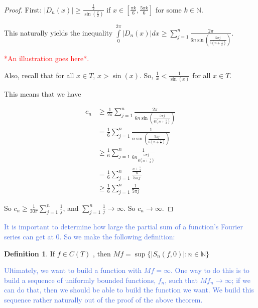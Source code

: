 \documentclass{amsart}
\newcommand{\N}{\mathbb{N}}
\newcommand{\colorcomment}[2]{\textcolor{#1}{#2}} %
\newcommand{\absval}[1]{\lvert #1 \rvert}
\theoremstyle{definition}
\newtheorem{definition}[thm]{Definition}
\begin{document}
\begin{proof}

First: $\absval{D_n(x)} \geq \frac{\frac{1}{2}}{\sin(\frac{x}{2})}$ if $x \in [\frac{\pi k}{6},\frac{5 \pi k}{6}]$ for some $k \in \N$.

This naturally yields the inequality $\int\limits_0^{2\pi} \absval{D_n(x)} dx \geq \sum\limits_{j=1}^n \frac{2 \pi}{6n \sin(\frac{5\pi j}{6(n+\frac{1}{2})})}$. 

\colorcomment{red}{*An illustration goes here*.}

Also, recall that for all $x \in T$, $x > \sin(x)$. 
So, $\frac{1}{x} < \frac{1}{\sin(x)}$ for all $x \in T$.

This means that we have

\begin{align*}
c_n &\geq \frac{1}{2 \pi} \sum\limits_{j=1}^n \frac{2 \pi}{6n \sin(\frac{5\pi j}{6(n+\frac{1}{2})})}\\
&= \frac{1}{6} \sum\limits_{j=1}^n \frac{1}{n \sin(\frac{5\pi j}{6(n+\frac{1}{2})})}\\
&\geq \frac{1}{6} \sum\limits_{j=1}^n \frac{1}{6n \frac{5\pi j}{6(n+\frac{1}{2})}}\\
&= \frac{1}{6} \sum\limits_{j=1}^n \frac{\frac{n+\frac{1}{2}}{n}}{5\pi j}\\
&\geq \frac{1}{6} \sum\limits_{j=1}^n \frac{1}{5\pi j}
\end{align*}

So $c_n \geq \frac{1}{30 \pi} \sum\limits_{j=1}^n \frac{1}{ j}$, and $\sum\limits_{j=1}^n \frac{1}{j} \to \infty$. So $c_n \to \infty$.

\end{proof}

\colorcomment{RoyalBlue}{It is important to determine how large the partial sum of a function's Fourier series can get at $0$. 
So we make the following definition:}

\begin{definition}
If $f \in C(T)$ , then $Mf = \sup\{\absval{S_n(f,0)} : n \in \N\}$ 
\end{definition}


\colorcomment{RoyalBlue}{Ultimately, we want to build a function with $Mf = \infty$.
One way to do this is to build a sequence of uniformly bounded functions, $f_n$, such that $Mf_n \to \infty$; 
if we can do that, then we should be able to build the function we want.
We build this sequence rather naturally out of the proof of the above theorem.}
\end{document}
